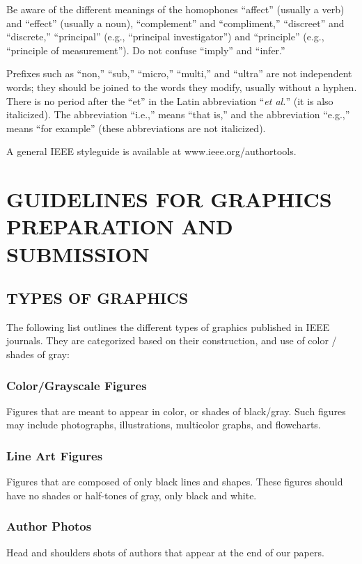 \documentclass{IEEEoj}
\begin{document}
Be aware of the different meanings of the homophones ``affect'' (usually a 
verb) and ``effect'' (usually a noun), ``complement'' and ``compliment,'' 
``discreet'' and ``discrete,'' 
``principal'' (e.g., ``principal investigator'') and ``principle'' 
(e.g., ``principle of measurement''). Do not confuse ``imply'' and 
``infer.'' 

Prefixes such as ``non,'' ``sub,'' ``micro,'' ``multi,'' and ``ultra'' are 
not independent words; they should be joined to the words they modify, 
usually without a hyphen. There is no period after the ``et'' in the Latin 
abbreviation ``\textit{et al.}'' (it is also italicized). The abbreviation ``i.e.,'' means 
``that is,'' and the abbreviation ``e.g.,'' means ``for example'' (these 
abbreviations are not italicized).

A general IEEE styleguide is available at www.ieee.org/\break authortools.

\section{GUIDELINES FOR GRAPHICS PREPARATION 
AND SUBMISSION}
\subsection{TYPES OF GRAPHICS}
The following list outlines the different types of graphics published in 
IEEE journals. They are categorized based on their construction, and use of 
color / shades of gray:

\subsubsection{Color/Grayscale Figures}
Figures that are meant to appear in color, or shades of black/gray. Such 
figures may include photographs, illustrations, multicolor graphs, and 
flowcharts.

\subsubsection{Line Art Figures}
Figures that are composed of only black lines and shapes. These figures 
should have no shades or half-tones of gray, only black and white.

\subsubsection{Author Photos}
Head and shoulders shots of authors that appear at the end of our papers. 
\end{document}
